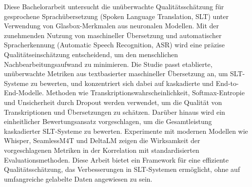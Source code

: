 
\Abstract
Diese Bachelorarbeit untersucht die unüberwachte Qualitätsschätzung für gesprochene Sprachübersetzung (Spoken Language Translation, SLT) unter Verwendung von Glasbox-Merkmalen aus neuronalen Modellen. 
Mit der zunehmenden Nutzung von maschineller Übersetzung und automatischer Spracherkennung (Automatic Speech Recognition, ASR) wird eine präzise Qualitätseinschätzung entscheidend, um den menschlichen Nachbearbeitungsaufwand zu minimieren. 
Die Studie passt etablierte, unüberwachte Metriken aus textbasierter maschineller Übersetzung an, um SLT-Systeme zu bewerten, und konzentriert sich dabei auf kaskadierte und End-to-End-Modelle. 
Methoden wie Transkriptionswahrscheinlichkeit, Softmax-Entropie und Unsicherheit durch Dropout werden verwendet, um die Qualität von Transkriptionen und Übersetzungen zu schätzen. 
Darüber hinaus wird ein einheitlicher Bewertungsansatz vorgeschlagen, um die Gesamtleistung kaskadierter SLT-Systeme zu bewerten. 
Experimente mit modernen Modellen wie Whisper, SeamlessM4T und DeltaLM zeigen die Wirksamkeit der vorgeschlagenen Metriken in der Korrelation mit standardisierten Evaluationsmethoden. 
Diese Arbeit bietet ein Framework für eine effiziente Qualitätsschätzung, das Verbesserungen in SLT-Systemen ermöglicht, ohne auf umfangreiche gelabelte Daten angewiesen zu sein.